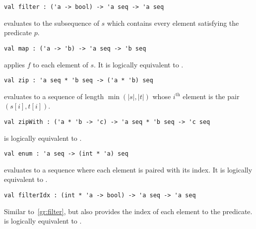 \begin{gram}[filter]
\label{gr:filter}
\begin{verbatim}
val filter : ('a -> bool) -> 'a seq -> 'a seq
\end{verbatim}
 evaluates to the subsequence of $s$ which contains every
element satisfying the predicate $p$.
\end{gram}

\begin{gram}[map]
\label{gr:map}
\begin{verbatim}
val map : ('a -> 'b) -> 'a seq -> 'b seq
\end{verbatim}
 applies $f$ to each element of $s$. It is logically equivalent
to .
\end{gram}

\begin{gram}[zip]
\label{gr:zip}
\begin{verbatim}
val zip : 'a seq * 'b seq -> ('a * 'b) seq
\end{verbatim}
 evaluates to a sequence of length $\min(|s|,|t|)$ whose $i^\text{th}$
element is the pair $(s[i], t[i])$.
\end{gram}

\begin{gram}[zipWith]
\label{gr:zipWith}
\begin{verbatim}
val zipWith : ('a * 'b -> 'c) -> 'a seq * 'b seq -> 'c seq
\end{verbatim}
 is logically equivalent to .
\end{gram}

\begin{gram}[enum]
\label{gr:enum}
\begin{verbatim}
val enum : 'a seq -> (int * 'a) seq
\end{verbatim}
 evaluates to a sequence where each element is paired with its
index. It is logically equivalent to
.
\end{gram}

\begin{gram}[filterIdx]
\label{gr:filterIdx}
\begin{verbatim}
val filterIdx : (int * 'a -> bool) -> 'a seq -> 'a seq
\end{verbatim}
Similar to~\ref{gr:filter}, but also provides the
index of each element to the predicate.
 is logically equivalent to
.
\end{gram}

